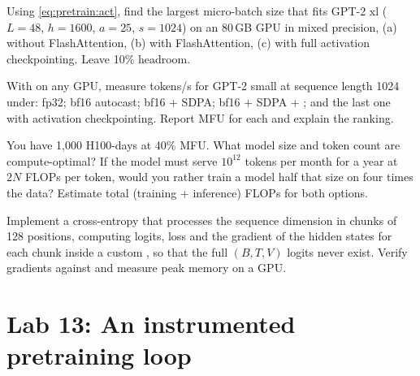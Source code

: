 \begin{exercise}
Using \cref{eq:pretrain:act}, find the largest micro-batch size that fits GPT-2 xl
($L=48$, $h=1600$, $a=25$, $s=1024$) on an 80\,GB GPU in mixed precision, (a) without
FlashAttention, (b) with FlashAttention, (c) with full activation checkpointing. Leave 10\%
headroom.
\end{exercise}

\begin{exercise}
With  on any GPU, measure tokens/s for GPT-2 small at sequence length 1024
under: fp32; bf16 autocast; bf16 + SDPA; bf16 + SDPA + ; and the last one
with activation checkpointing. Report MFU for each and explain the ranking.
\end{exercise}

\begin{exercise}
You have 1{,}000 H100-days at 40\% MFU. What model size and token count are compute-optimal?
If the model must serve $10^{12}$ tokens per month for a year at $2N$ FLOPs per token, would you
rather train a model half that size on four times the data? Estimate total (training +
inference) FLOPs for both options.
\end{exercise}

\begin{exercise}\label{ex:pretrain:chunked}
Implement a cross-entropy that processes the sequence dimension in chunks of 128 positions,
computing logits, loss and the gradient of the hidden states for each chunk inside a custom
, so that the full $(B,T,V)$ logits never exist. Verify gradients
against  and measure peak memory on a GPU.
\end{exercise}

\section{Lab 13: An instrumented pretraining loop}\label{sec:pretrain:lab}

